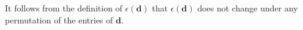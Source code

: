 \begin{Remark}\label{rm:permutation:of:d}
It follows from the definition of $\epsilon(\boldsymbol{d})$ that $\epsilon(\boldsymbol{d})$ does not change under any permutation of the entries of $\boldsymbol{d}$.
\end{Remark}

